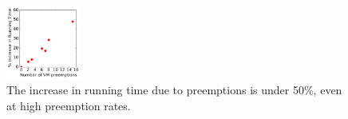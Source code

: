 \begin{figure}[t]
  \centering 
       \vspace*{\myfigspace} \includegraphics[width=0.22\textwidth]{../graphs/confin-fails-vs-time-relative.pdf}
      \vspace*{\myfigspace}
      \caption{The increase in running time due to preemptions is under 50\%, even at high preemption rates.}
  \label{fig:fails-time}
        \vspace*{\myfigspace}
\end{figure}




\vspace*{\subsecspace}





















